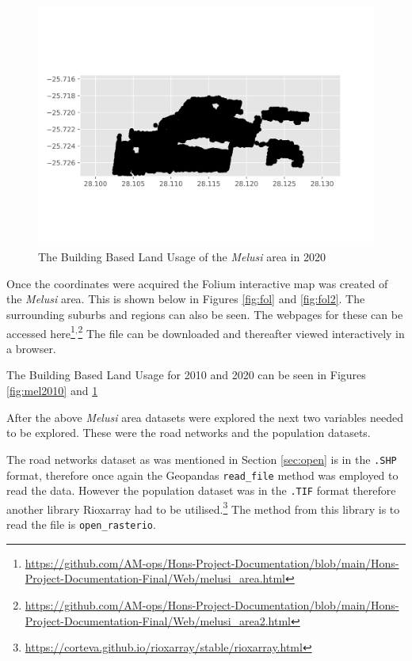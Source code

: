 \begin{figure}[H]
\centering
\includegraphics[width=1\textwidth]{Figures/Chapter3/Melusi2020}
\caption{The Building Based Land Usage of the \textit{Melusi} area in 2020}
\label{fig:mel2020}
\end{figure}
Once the coordinates were acquired the Folium interactive map was created of the \textit{Melusi} area. This is shown below in Figures \ref{fig:fol} and \ref{fig:fol2}. The surrounding suburbs and regions can also be seen. The webpages for these can be accessed here\footnote{\url{https://github.com/AM-ops/Hons-Project-Documentation/blob/main/Hons-Project-Documentation-Final/Web/melusi_area.html}}$^{,}$\footnote{\url{https://github.com/AM-ops/Hons-Project-Documentation/blob/main/Hons-Project-Documentation-Final/Web/melusi_area2.html}}
The file can be downloaded and thereafter viewed interactively in a browser.

The Building Based Land Usage for 2010 and 2020 can be seen in Figures \ref{fig:mel2010} and \ref{fig:mel2020}

After the above \textit{Melusi} area datasets were explored the next two variables needed to be explored. These were the road networks and the population datasets.

The road networks dataset as was mentioned in Section \ref{sec:open} is in the \texttt{.SHP} format, therefore once again the Geopandas \texttt{read\_file} method was employed to read the data. However the population dataset was in the \texttt{.TIF} format therefore another library Rioxarray had to be utilised.\footnote{\url{https://corteva.github.io/rioxarray/stable/rioxarray.html}} The method from this library is to read the file is \texttt{open\_rasterio}.

